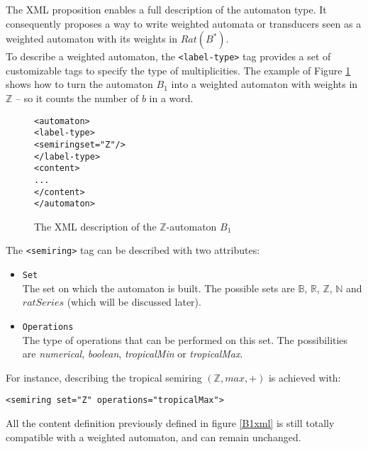 \documentclass[a4paper]{llncs}
\def\typetagend{\texttt{</label-type>}}
\def\typetag{\texttt{<label-type>}}
\def\semiringtag{\texttt{<semiring>}}
\begin{document}
The XML proposition enables a full description of the automaton type.
It consequently proposes a way to write weighted automata or transducers
seen as a weighted automaton with its weights in $Rat(B^*)$.\\

To describe a weighted automaton, the \typetag{} tag provides a set
of customizable tags to specify the type of multiplicities. The example
of Figure \ref{B1Zxml} shows how to turn the automaton $B_1$ into a
weighted automaton with weights in ${\mathbb Z}$ -- so it counts the
number of $b$ in a word.

{\small

\begin{figure}[h]
  \begin{center}
\begin{alltt}
<automaton>
  \typetag{}
     <semiring set="Z"/>
  \typetagend{}
  <content>
  ...
  </content>
</automaton>
\end{alltt}

\caption{The XML description of the $\mathbb{Z}$-automaton $B_1$}
\label{B1Zxml}
  \end{center}
\end{figure}

}

The \semiringtag{} tag can be described with two attributes:
\begin{itemize}
  \item \texttt{Set}\\
    The set on which the automaton is built. The possible sets are
    ${\mathbb B}$, ${\mathbb R}$, ${\mathbb Z}$, ${\mathbb N}$ and $ratSeries$
    (which will be discussed later).
  \item \texttt{Operations}\\
    The type of operations that can be performed on this set.
    The possibilities are \textit{numerical}, \textit{boolean}, \textit{tropicalMin}
    or \textit{tropicalMax}.
\end{itemize}

For instance, describing the tropical semiring $({\mathbb Z}, max, +)$
is achieved with:
\begin{center}
{\small
\verb|<semiring set="Z" operations="tropicalMax">|}
\end{center}

All the content definition previously defined in figure \ref{B1xml} is
still totally compatible with a weighted automaton, and can remain
unchanged.\\
\end{document}

